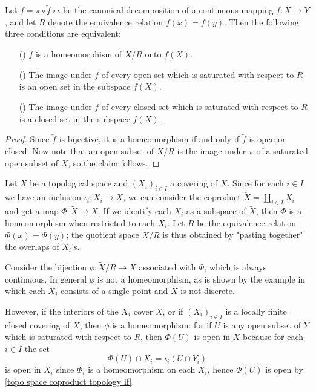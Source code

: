 \begin{proposition}\label{topo space canonical decomposition homeomorphism iff}
Let $f=\pi\circ\tilde{f}\circ\iota$ be the canonical decomposition of a continuous mapping $f:X\to Y$, and let $R$ denote the equivalence relation $f(x)=f(y)$. Then the following three conditions are equivalent:
\begin{itemize}
\item[(\rmnum{1})] $\tilde{f}$ is a homeomorphism of $X/R$ onto $f(X)$.
\item[(\rmnum{2})] The image under $f$ of every open set which is saturated with respect to $R$ is an open set in the subspace $f(X)$.
\item[(\rmnum{3})] The image under $f$ of every closed set which is saturated with respect to $R$ is a closed set in the subspace $f(X)$.
\end{itemize}
\end{proposition}
\begin{proof}
Since $\tilde{f}$ is bijective, it is a homeomorphism if and only if $\tilde{f}$ is open or closed. Now note that an open subset of $X/R$ is the image under $\pi$ of a saturated open subset of $X$, so the claim follows.
\end{proof}
\begin{example}
Let $X$ be a topological space and $(X_i)_{i\in I}$ a covering of $X$. Since for each $i\in I$ we have an inclusion $\iota_i:X_i\to X$, we can consider the coproduct $\widetilde{X}=\coprod_{i\in I}X_i$ and get a map $\Phi:\widetilde{X}\to X$. If we identify each $X_i$ as a subspace of $\widetilde{X}$, then $\Phi$ is a homeomorphism when restricted to each $X_i$. Let $R$ be the equivalence relation $\Phi(x)=\Phi(y)$; the quotient space $\tilde{X}/R$ is thus obtained by "pasting together" the overlaps of $X_i$'s.\par
Consider the bijection $\phi:\widetilde{X}/R\to X$ associated with $\Phi$, which is always continuous. In general $\phi$ is not a homeomorphism, as is shown by the example in which each $X_i$ consists of a single point and $X$ is not discrete.\par
However, if the interiors of the $X_i$ cover $X$, or if $(X_i)_{i\in I}$ is a locally finite closed covering of $X$, then $\phi$ is a homeomorphism: for if $U$ is any open subset of $Y$ which is saturated with respect to $R$, then $\Phi(U)$ is open in $X$ because for each $i\in I$ the set
\[\Phi(U)\cap X_i=\iota_i(U\cap Y_i)\]
is open in $X_i$ since $\Phi_i$ is a homeomorphism on each $X_i$, hence $\Phi(U)$ is open by \cref{topo space coproduct topology if}.
\end{example}
